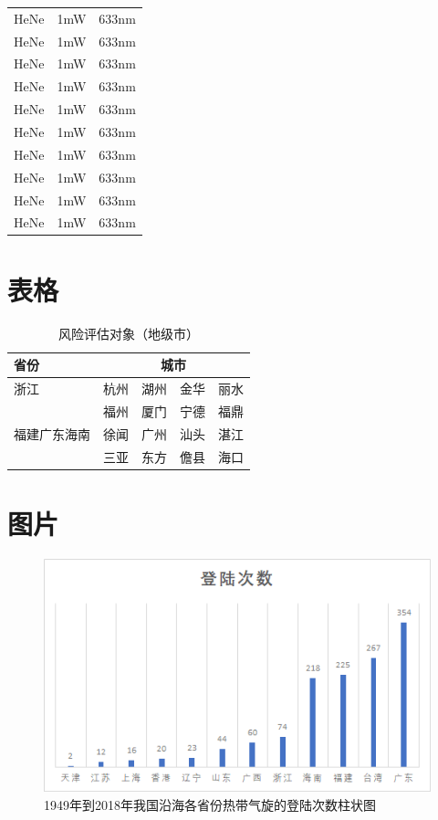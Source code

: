 \documentclass[withoutpreface,bwprint]{cumcmthesis} %
\begin{document}
\begin{appendices}
\begin{longtable}[c]{p{}<{\centering}|p{}<{\centering}p{}<{\centering}}
    HeNe & 1mW & 633nm \\
    HeNe & 1mW & 633nm \\
    HeNe & 1mW & 633nm \\
    HeNe & 1mW & 633nm \\
    HeNe & 1mW & 633nm \\
    HeNe & 1mW & 633nm \\
    HeNe & 1mW & 633nm \\
    HeNe & 1mW & 633nm \\
    HeNe & 1mW & 633nm \\
    HeNe & 1mW & 633nm \\
\end{longtable}

\section{表格}
\begin{table}[htbp]
    \caption{风险评估对象（地级市）}
    \centering    
    \label{table1}
    \begin{tabular}{m{}<{\centering}|
        m{}<{\centering}m{}<{\centering}
        m{}<{\centering}m{}<{\centering}}
    \toprule[2pt]
         省份  &  \multicolumn{4}{c}{城市}  \\%
    \midrule[1pt]
        浙江  &  杭州  &  湖州  &  金华  &  丽水  \\
        \cline{1-3}
        \multirow{3}{0.1\textwidth}{福建广东海南}
        &  福州  &  厦门  &  宁德  &  福鼎  \\
        &  徐闻  &  广州  &  汕头  \vline&  湛江  \\
        &  三亚  &  东方  &  儋县  &  海口  \\
    \bottomrule[1.5pt]
    \end{tabular}
\end{table}

\section{图片}
\begin{figure}[!h]
    \centering
    \includegraphics[width=.6\textwidth]{1949-2018_province_occurence.png}
    \caption{1949年到2018年我国沿海各省份热带气旋的登陆次数柱状图}
    \label{figure1}
\end{figure}



\end{appendices}
\end{document}
